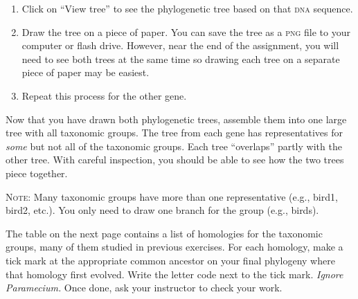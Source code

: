 \documentclass[12pt, hidelinks]{exam}
\newcommand{\dna}{\textsc{dna}}
\begin{document}
\begin{enumerate}
	\item Click on ``View tree'' to see the phylogenetic tree based on that \dna{} sequence.
	
	\item Draw the tree on a piece of paper. You can save the tree as a \textsc{png} file to your computer or flash drive. However, near the end of the assignment, you will need to see both trees at the same time so drawing each tree on a separate piece of paper may be easiest. \label{final_step}
	
	\item Repeat this process for the other gene.

\end{enumerate}

\begin{questions}

\question
Now that you have drawn both phylogenetic trees, assemble them into one large tree with all taxonomic groups. The tree from each gene has representatives for \emph{some} but not all of the taxonomic groups. Each tree ``overlaps'' partly with the other tree. With careful inspection, you should be able to see how the two trees piece together. 

\textsc{Note:} Many taxonomic groups have more than one representative (e.g., bird1, bird2, etc.). You only need to draw one branch for the group (e.g., birds).

\question[Checkout]
The table on the next page contains a list of homologies for the taxonomic groups, many of them studied in previous exercises. For each homology, make a tick mark at the appropriate common ancestor on your final phylogeny where that homology first evolved. Write the letter code next to the tick mark. \textit{Ignore Paramecium.} Once done, ask your instructor to check your work.

\end{questions}

\newpage

\thispagestyle{empty}
\end{document}
